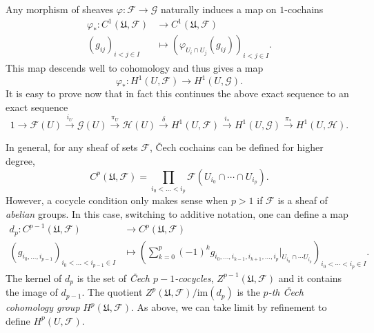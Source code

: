 \documentclass[12pt,a4paper]{article}
\begin{document}
	  Any morphism of sheaves $\varphi:\mathcal{F} \rightarrow \mathcal{G}$ naturally induces a map on $1$-cochains
	  \begin{align*}
	    \varphi_*:C^1(\mathfrak{U},\mathcal{F})&\longrightarrow C^1(\mathfrak{U},\mathcal{F})\\ 
	    (g_{ij})_{i<j \in I} &\longmapsto (\varphi_{U_i \cap U_j} (g_{ij}))_{i<j \in I}. 
	    \end{align*}
	    This map descends well to cohomology and thus gives a map $$\varphi_*:H^1(U,\mathcal{F}) \rightarrow H^1(U,\mathcal{G}).$$
	    It is easy to prove now that in fact this continues the above exact sequence to an exact sequence
	    \begin{equation*}
	      1\rightarrow \mathcal{F}(U) \overset{i_U}{\rightarrow} \mathcal{G}(U) \overset{\pi_U}{\rightarrow} \mathcal{H}(U) \overset{\delta}{\rightarrow} H^1(U,\mathcal{F}) \overset{i_*}{\rightarrow} H^1(U,\mathcal{G}) \overset{\pi_*}{\rightarrow} H^1(U,\mathcal{H}).
	    \end{equation*}
	  
	    In general, for any sheaf of sets $\mathcal{F}$, \v{C}ech cochains can be defined for higher degree,
	    \begin{equation*}
	      C^p(\mathfrak{U},\mathcal{F})=\prod_{i_0<\dots<i_p} \mathcal{F}(U_{i_0} \cap \cdots \cap U_{i_p}).
	    \end{equation*}
	    However, a cocycle condition only makes sense when $p>1$ if $\mathcal{F}$ is a sheaf of \emph{abelian} groups. In this case, switching to additive notation, one can define a map
	    \begin{align*}
	      d_p :C^{p-1}(\mathfrak{U},\mathcal{F})&\longrightarrow C^p(\mathfrak{U},\mathcal{F}) \\ 
	      (g_{i_0,\dots,i_{p-1}})_{i_0<\dots<i_{p-1}\in I} &\longmapsto \left( \sum_{k=0}^p (-1)^k g_{i_0,\dots,i_{k-1},i_{k+1},\dots,i_p}|_{U_{i_0} \cap \cdots U_{i_p}} \right)_{i_0<\cdots<i_p\in I}. 
	      \end{align*}
	      The kernel of $d_p$ is the set of \emph{\v{C}ech $p-1$-cocycles}, $Z^{p-1}(\mathfrak{U},\mathcal{F})$ and it contains the image of $d_{p-1}$. The quotient $Z^{p}(\mathfrak{U},\mathcal{F})/\mathrm{im}(d_p)$ is the \emph{$p$-th \v{C}ech cohomology group} $H^p(\mathfrak{U},\mathcal{F})$. As above, we can take limit by refinement to define $H^p(U,\mathcal{F})$.
\end{document}
